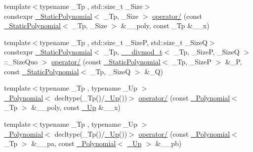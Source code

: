\begin{DoxyCompactItemize}
\item 
{\footnotesize template$<$typename \+\_\+\+Tp , std\+::size\+\_\+t \+\_\+\+Size$>$ }\\constexpr \hyperlink{class____gnu__cxx_1_1__StaticPolynomial}{\+\_\+\+Static\+Polynomial}$<$ \+\_\+\+Tp, \+\_\+\+Size $>$ \hyperlink{namespace____gnu__cxx_a646b9470b937733c916192c121e8ecdb}{operator/} (const \hyperlink{class____gnu__cxx_1_1__StaticPolynomial}{\+\_\+\+Static\+Polynomial}$<$ \+\_\+\+Tp, \+\_\+\+Size $>$ \&\+\_\+\+\_\+poly, const \+\_\+\+Tp \&\+\_\+\+\_\+x)
\item 
{\footnotesize template$<$typename \+\_\+\+Tp , std\+::size\+\_\+t \+\_\+\+SizeP, std\+::size\+\_\+t \+\_\+\+SizeQ$>$ }\\constexpr \hyperlink{class____gnu__cxx_1_1__StaticPolynomial}{\+\_\+\+Static\+Polynomial}$<$ \+\_\+\+Tp, \hyperlink{struct____gnu__cxx_1_1____divmod__t}{\+\_\+\+\_\+divmod\+\_\+t}$<$ \+\_\+\+Tp, \+\_\+\+SizeP, \+\_\+\+SizeQ $>$\+::\+\_\+\+Size\+Quo $>$ \hyperlink{namespace____gnu__cxx_a451a609c6de284cdeed747a994938801}{operator/} (const \hyperlink{class____gnu__cxx_1_1__StaticPolynomial}{\+\_\+\+Static\+Polynomial}$<$ \+\_\+\+Tp, \+\_\+\+SizeP $>$ \&\+\_\+P, const \hyperlink{class____gnu__cxx_1_1__StaticPolynomial}{\+\_\+\+Static\+Polynomial}$<$ \+\_\+\+Tp, \+\_\+\+SizeQ $>$ \&\+\_\+Q)
\item 
{\footnotesize template$<$typename \+\_\+\+Tp , typename \+\_\+\+Up $>$ }\\\hyperlink{class____gnu__cxx_1_1__Polynomial}{\+\_\+\+Polynomial}$<$ decltype(\+\_\+\+Tp()/\hyperlink{namespace____gnu__cxx_ab693ea357b6429b331e0bf09f9442385}{\+\_\+\+Up}())$>$ \hyperlink{namespace____gnu__cxx_a5fd356349013bd60a41010cbf502444b}{operator/} (const \hyperlink{class____gnu__cxx_1_1__Polynomial}{\+\_\+\+Polynomial}$<$ \+\_\+\+Tp $>$ \&\+\_\+\+\_\+poly, const \hyperlink{namespace____gnu__cxx_ab693ea357b6429b331e0bf09f9442385}{\+\_\+\+Up} \&\+\_\+\+\_\+x)
\item 
{\footnotesize template$<$typename \+\_\+\+Tp , typename \+\_\+\+Up $>$ }\\\hyperlink{class____gnu__cxx_1_1__Polynomial}{\+\_\+\+Polynomial}$<$ decltype(\+\_\+\+Tp()/\hyperlink{namespace____gnu__cxx_ab693ea357b6429b331e0bf09f9442385}{\+\_\+\+Up}())$>$ \hyperlink{namespace____gnu__cxx_a6ba146c479b383e9ba26760c847e3dc6}{operator/} (const \hyperlink{class____gnu__cxx_1_1__Polynomial}{\+\_\+\+Polynomial}$<$ \+\_\+\+Tp $>$ \&\+\_\+\+\_\+pa, const \hyperlink{class____gnu__cxx_1_1__Polynomial}{\+\_\+\+Polynomial}$<$ \hyperlink{namespace____gnu__cxx_ab693ea357b6429b331e0bf09f9442385}{\+\_\+\+Up} $>$ \&\+\_\+\+\_\+pb)

\end{DoxyCompactItemize}
